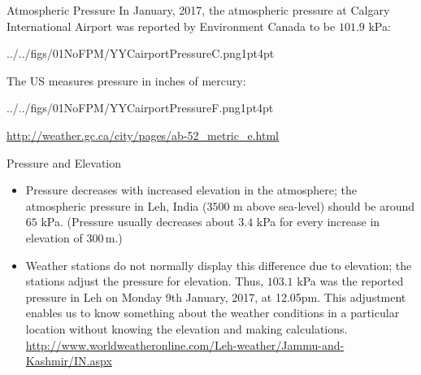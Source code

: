 \documentclass[9pt,xcolor={svgnames, x11names},professionalfonts, mathserif]{beamer}
\begin{document}
\begin{frame}{Atmospheric Pressure}
 In January, 2017, the atmospheric pressure at Calgary International Airport was reported by Environment Canada to be $101.9$ kPa:
 \begin{center}
  \begin{imgboxbg}[white]{0.45}{../../figs/01NoFPM/YYCairportPressureC.png}{1pt}{4pt}
  \end{imgboxbg}
 \end{center}
 The US measures pressure in inches of mercury:
 \begin{center}
  \begin{imgboxbg}[white]{0.45}{../../figs/01NoFPM/YYCairportPressureF.png}{1pt}{4pt}
  \end{imgboxbg}
  \pars
  \href{http://weather.gc.ca/city/pages/ab-52\_metric\_e.html}{http://weather.gc.ca/city/pages/ab-52\_metric\_e.html}
 \end{center}
\end{frame}
\begin{frame}{Pressure and Elevation}
 \begin{itemize}
  \item Pressure decreases with increased elevation in the atmosphere; the
        atmospheric pressure in Leh, India ($3500$ m above sea-level) should be around $65$ kPa. (Pressure usually decreases about $3.4$ kPa for every increase in elevation of $300\,\text{m}$.) \pause\parm
  \item Weather stations do not normally display this difference due to elevation;
        the stations adjust the pressure for elevation.
        Thus, $103.1$ kPa was the reported pressure in Leh on Monday 9th January, 2017, at 12.05pm. This adjustment enables us to know something about the weather conditions in a particular location without knowing the elevation and making calculations.\parm
        {\small \href{http://www.worldweatheronline.com/Leh-weather/Jammu-and-Kashmir/IN.aspx}{http://www.worldweatheronline.com/Leh-weather/Jammu-and-Kashmir/IN.aspx} }
 \end{itemize}
\end{frame}
\end{document}
